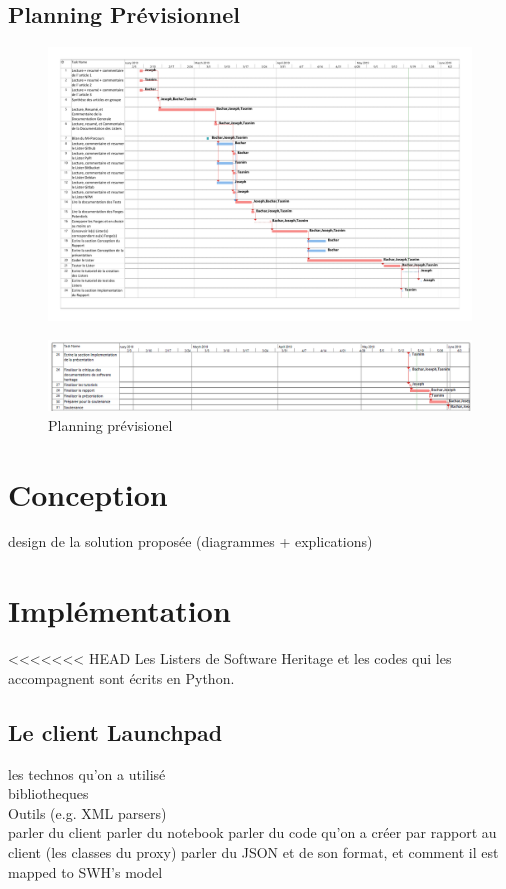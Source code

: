 \documentclass[12pt,a4paper]{report}
\theoremstyle{definition}
\begin{document}
\section{Planning Prévisionnel}
\begin{figure}[!ht]
\hspace*{-3.5cm}
\includegraphics[scale=0.48]{pdfs/feuille_de_route.pdf}
\end{figure}

\begin{figure}[!ht]
\hspace*{-3cm}
\includegraphics[scale=0.57]{images/planning_prev_p2.PNG}
\caption{Planning prévisionel}
\end{figure}

\chapter{Conception}
design de la solution proposée (diagrammes + explications)

\chapter{Implémentation}
<<<<<<< HEAD
	Les Listers de Software Heritage et les codes qui les accompagnent sont écrits en Python. 
	
	\section{Le client Launchpad}
	les technos qu'on a utilisé\\
	bibliotheques\\
	Outils (e.g. XML parsers)\\
	parler du client
	parler du notebook
	parler du code qu'on a créer par rapport au client (les classes du proxy)
	parler du JSON et de son format, et comment il est mapped to SWH's model
		
\end{document}
